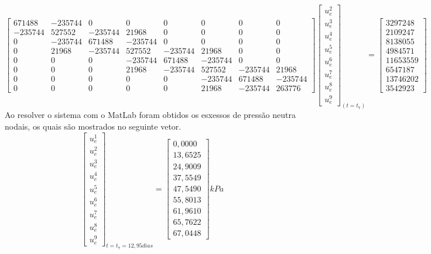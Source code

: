 \documentclass{article} %
\begin{document}
\begin{equation*}
\begin{bmatrix}
671488& -235744& 0& 0& 0& 0& 0& 0\\
-235744&527552&-235744&21968& 0& 0& 0& 0\\
0&-235744&671488&-235744& 0& 0& 0& 0\\
0&21968&-235744&527552&-235744&21968& 0& 0\\
0&0&0& -235744&671488&-235744& 0& 0\\
0&0&0&21968&-235744&527552&-235744&21968\\
0&0&0&0&0&-235744&671488&-235744\\
0&0&0&0&0&21968&-235744&263776
\end{bmatrix}\begin{bmatrix}
u_e^2\\
u_e^3\\
u_e^4\\
u_e^5\\
u_e^6\\
u_e^7\\
u_e^8\\
u_e^9
\end{bmatrix}_{(t=t_7)}
=\begin{bmatrix}
3297248\\
2109247\\
8138055\\
4984571\\
11653559\\
6547187\\
13746202\\
3542923
\end{bmatrix}
\end{equation*}
\indent Ao resolver o sistema com o MatLab foram obtidos os esxessos de pressão neutra nodais, os quais são mostrados no seguinte vetor.
\begin{equation}\label{t7}
\begin{bmatrix}
u_e^1\\
u_e^2\\
u_e^3\\
u_e^4\\
u_e^5\\
u_e^6\\
u_e^7\\
u_e^8\\
u_e^9
\end{bmatrix}_{t=t_7=12,95dias}=\begin{bmatrix}
0,0000\\
13,6525\\
24,9009\\
37,5549\\
47,5490\\
55,8013\\
61,9610\\
65,7622\\
67,0448
\end{bmatrix}kPa
\end{equation}
\end{document}
